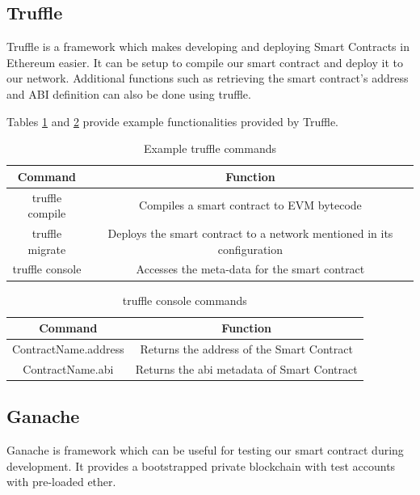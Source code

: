 \documentclass[11pt,openright]{report}
\begin{document}
\subsection{Truffle}
Truffle is a framework which makes developing and deploying Smart Contracts in Ethereum easier. It can be setup to compile our smart contract and deploy it to our network. Additional functions such as retrieving the smart contract's address and ABI definition can also be done using truffle.

Tables \ref{truffle_commands} and \ref{truffle_console} provide example functionalities provided by Truffle.

\begin{table}[!htbp]
	\renewcommand{\arraystretch}{1.3}
	\caption{Example truffle commands}
	\label{truffle_commands}
	\centering
	\begin{tabular}{|c|c|}
		\hline
		\bfseries Command & \bfseries Function \\
		\hline\hline
		truffle compile & Compiles a smart contract to EVM bytecode \\ \hline
		truffle migrate & Deploys the smart contract to a network mentioned in its configuration \\ \hline
		truffle console & Accesses the meta-data for the smart contract \\ \hline
	\end{tabular}
\end{table}

\begin{table}[!htbp]
	\renewcommand{\arraystretch}{1.3}
	\caption{truffle console commands}
	\label{truffle_console}
	\centering
	\begin{tabular}{|c|c|}
		\hline
		\bfseries Command & \bfseries Function \\
		\hline\hline
		ContractName.address & Returns the address of the Smart Contract \\ \hline
		ContractName.abi & Returns the abi metadata of Smart Contract \\ \hline

	\end{tabular}
\end{table}

\subsection{Ganache}
Ganache is framework which can be useful for testing our smart contract during development. It provides a bootstrapped private blockchain with test accounts with pre-loaded ether.
\end{document}
